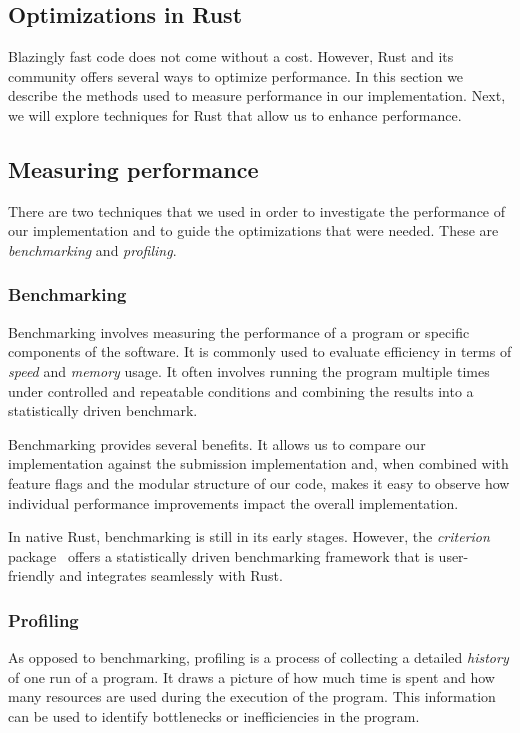 \documentclass[11pt]{report}
\theoremstyle{definition}
\theoremstyle{plain}
\begin{document}
\subsection{Optimizations in Rust}\label{sub:rust_optimizations}
Blazingly fast code does not come without a cost. However, Rust and its community offers several ways to optimize performance. In this section we describe the methods used to measure performance in our implementation. Next, we will explore techniques for Rust that allow us to enhance performance.

\subsection*{Measuring performance}\label{sec:rust_benchmarking}
There are two techniques that we used in order to investigate the performance of our implementation and  to guide the optimizations that were needed. These are \textit{benchmarking} and \textit{profiling}.

\subsubsection{Benchmarking}
Benchmarking involves measuring the performance of a program or specific components of the software. It is commonly used to evaluate efficiency in terms of \textit{speed} and \textit{memory} usage. It often involves running the program multiple times under controlled and repeatable conditions and combining the results into a statistically driven benchmark.

Benchmarking provides several benefits. It allows us to compare our implementation against the submission implementation and, when combined with feature flags and the modular structure of our code, makes it easy to observe how individual performance improvements impact the overall implementation.

In native Rust, benchmarking is still in its early stages. However, the \textit{criterion} package~\cite{criterion} offers a statistically driven benchmarking framework that is user-friendly and integrates seamlessly with Rust.

\subsubsection{Profiling}
As opposed to benchmarking, profiling is a process of collecting a detailed \textit{history} of one run of a program. It draws a picture of how much time is spent and how many resources are used during the execution of the program. This information can be used to identify bottlenecks or inefficiencies in the program.
\end{document}
